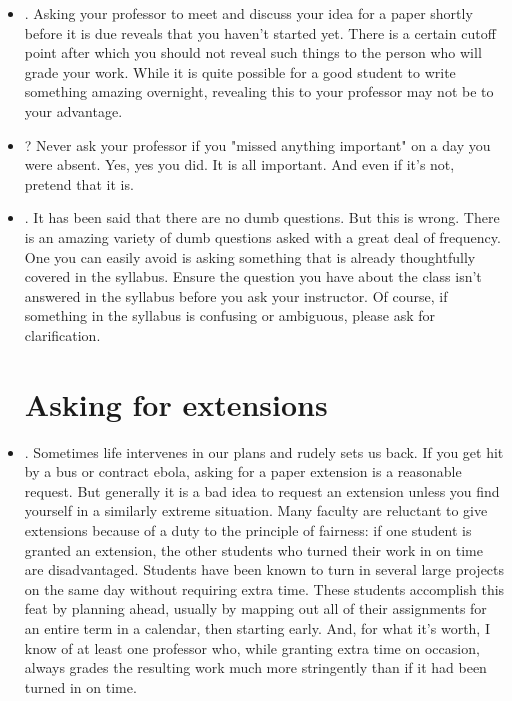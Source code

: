 \begin{itemize}

\item {}. Asking your professor to meet and discuss your idea for a paper shortly before it is due reveals that you haven't started yet. There is a certain cutoff point after which you should not reveal such things to the person who will grade your work. While it is quite possible for a good student to write something amazing overnight, revealing this to your professor may not be to your advantage. 

\item {}? Never ask your professor if you "missed anything important" on a day you were absent. Yes, yes you did. It is all important. And even if it's not, pretend that it is.

\item {}. It has been said that there are no dumb questions. But this is wrong. There is an amazing variety of dumb questions asked with a great deal of frequency. One you can easily avoid is asking something that is already thoughtfully covered in the syllabus. Ensure the question you have about the class isn't answered in the syllabus before you ask your instructor. Of course, if something in the syllabus is confusing or ambiguous, please ask for clarification. 

\section{Asking for extensions}

\item {}. Sometimes life intervenes in our plans and rudely sets us back. If you get hit by a bus or contract ebola, asking for a paper extension is a reasonable request. But generally it is a bad idea to request an extension unless you find yourself in a similarly extreme situation. Many faculty are reluctant to give extensions because of a duty to the principle of fairness: if one student is granted an extension, the other students who turned their work in on time are disadvantaged. Students have been known to turn in several large projects on the same day without requiring extra time. These students accomplish this feat by planning ahead, usually by mapping out all of their assignments for an entire term in a calendar, then starting early. And, for what it's worth, I know of at least one professor who, while granting extra time on occasion, always grades the resulting work much more stringently than if it had been turned in on time. 


\end{itemize}
